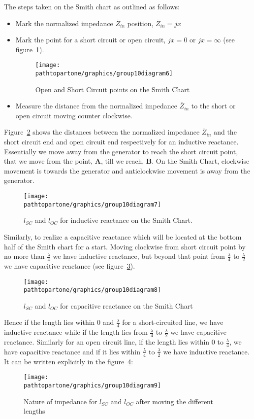 The steps taken on the Smith chart as outlined as follows:
\begin{itemize}
	\item Mark the normalized impedance $\bar{Z}_{in}$ position, $\bar{Z}_{in} = jx$
	\item Mark the point for a short circuit or open circuit, $jx = 0$ or $jx = \infty$ (see figure~\ref{fig:group10diagram6}).
	\begin{figure}[ht]
		\centering
		\texttt{[image: \\pathtopartone/graphics/group10diagram6]}
		\caption{Open and Short Circuit points on the Smith Chart}
		\label{fig:group10diagram6}
	\end{figure}
	
	\item Measure the distance from the normalized impedance $\bar{Z}_{in}$ to the short or open circuit moving counter clockwise. 
\end{itemize}

Figure~\ref{fig:group10diagram7} shows the distances between the normalized impedance $\bar{Z}_{in}$ and the short circuit end and open circuit end respectively for an inductive reactance. Essentially we move away from the generator to reach the short circuit point, that we move from the point, \textbf{A}, till we reach, \textbf{B}. On the Smith Chart, clockwise movement is towards the generator and anticlockwise movement is away from the generator.
\begin{figure}[ht]
	\centering
	\texttt{[image: \\pathtopartone/graphics/group10diagram7]}
	\caption{$ l_{SC} $ and $ l_{OC} $ for inductive reactance on the Smith Chart.}
	\label{fig:group10diagram7}
\end{figure}

Similarly, to realize a capacitive reactance which will be located at the bottom half of the Smith chart for a start. Moving clockwise from short circuit point by no more than $\frac{\lambda}{4}$ we have inductive reactance, but beyond that point from $\frac{\lambda}{4}$ to $\frac{\lambda}{2}$ we have capacitive reactance (see figure~\ref{fig:group10diagram9}).
\begin{figure}[ht]
	\centering
	\texttt{[image: \\pathtopartone/graphics/group10diagram8]}
	\caption{$ l_{SC} $ and $ l_{OC} $ for capacitive reactance on the Smith Chart}
	\label{fig:group10diagram9}
\end{figure}

Hence if the length lies within 0 and $ \frac{\lambda}{4} $ for a short-circuited line, we have inductive reactance while if the length lies from $ \frac{\lambda}{4} $ to $ \frac{\lambda}{2} $ we have capacitive reactance. Similarly for an open circuit line, if the length lies within 0 to $ \frac{\lambda}{4} $, we have capacitive reactance and if it lies within $ \frac{\lambda}{4} $ to $ \frac{\lambda}{2} $ we have inductive reactance. It can be written explicitly in the figure~\ref{fig:group10diagram10}:
\begin{figure}[ht]
	\centering
	\texttt{[image: \\pathtopartone/graphics/group10diagram9]}
	\caption{Nature of impedance for $ l_{SC} $ and $ l_{OC} $ after moving the different lengths}
	\label{fig:group10diagram10}
\end{figure}

